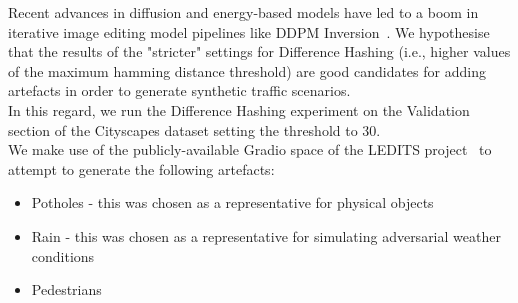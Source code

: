 \documentclass[letterpaper, 10 pt, conference]{ieeeconf}  %
\begin{document}
Recent advances in diffusion and energy-based models have led to a boom in iterative image editing model pipelines like DDPM Inversion~\cite{HubermanSpiegelglas2023}. We hypothesise that the results of the "stricter" settings for Difference Hashing (i.e., higher values of the maximum hamming distance threshold) are good candidates for adding artefacts in order to generate synthetic traffic scenarios. \\ 
In this regard, we run the Difference Hashing experiment on the Validation section of the Cityscapes dataset setting the threshold to 30. \\
We make use of the publicly-available Gradio space of the LEDITS project~\cite{tsaban2023ledits} to attempt to generate the following artefacts:
\begin{itemize}
    \item Potholes - this was chosen as a representative for physical objects
    \item Rain - this was chosen as a representative for simulating adversarial weather conditions
    \item Pedestrians
\end{itemize}
\end{document}
